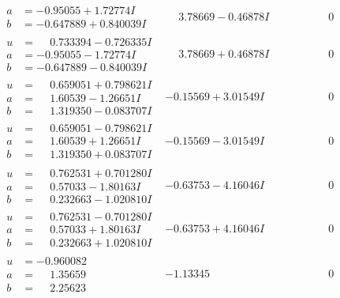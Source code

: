 \documentclass[1p]{elsarticle_modified}
\theoremstyle{definition}
\begin{document}
$$\begin{array}{c|c|c}
\begin{aligned}
a &= -0.95055 + 1.72774 I \\
b &= -0.647889 + 0.840039 I\end{aligned}
 & \phantom{-}3.78669 - 0.46878 I & \phantom{-0.000000 } 0 \\ \hline\begin{aligned}
u &= \phantom{-}0.733394 - 0.726335 I \\
a &= -0.95055 - 1.72774 I \\
b &= -0.647889 - 0.840039 I\end{aligned}
 & \phantom{-}3.78669 + 0.46878 I & \phantom{-0.000000 } 0 \\ \hline\begin{aligned}
u &= \phantom{-}0.659051 + 0.798621 I \\
a &= \phantom{-}1.60539 - 1.26651 I \\
b &= \phantom{-}1.319350 - 0.083707 I\end{aligned}
 & -0.15569 + 3.01549 I & \phantom{-0.000000 } 0 \\ \hline\begin{aligned}
u &= \phantom{-}0.659051 - 0.798621 I \\
a &= \phantom{-}1.60539 + 1.26651 I \\
b &= \phantom{-}1.319350 + 0.083707 I\end{aligned}
 & -0.15569 - 3.01549 I & \phantom{-0.000000 } 0 \\ \hline\begin{aligned}
u &= \phantom{-}0.762531 + 0.701280 I \\
a &= \phantom{-}0.57033 - 1.80163 I \\
b &= \phantom{-}0.232663 - 1.020810 I\end{aligned}
 & -0.63753 - 4.16046 I & \phantom{-0.000000 } 0 \\ \hline\begin{aligned}
u &= \phantom{-}0.762531 - 0.701280 I \\
a &= \phantom{-}0.57033 + 1.80163 I \\
b &= \phantom{-}0.232663 + 1.020810 I\end{aligned}
 & -0.63753 + 4.16046 I & \phantom{-0.000000 } 0 \\ \hline\begin{aligned}
u &= -0.960082\phantom{ +0.000000I} \\
a &= \phantom{-}1.35659\phantom{ +0.000000I} \\
b &= \phantom{-}2.25623\phantom{ +0.000000I}\end{aligned}
 & -1.13345\phantom{ +0.000000I} & \phantom{-0.000000 } 0 \\ \hline\begin{aligned}

\end{aligned}
\end{array}$$
\end{document}
